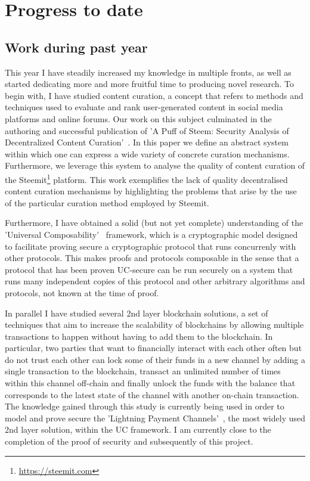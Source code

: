 \section{Progress to date}
  \subsection{Work during past year}
    This year I have steadily increased my knowledge in multiple fronts, as well
    as started dedicating more and more fruitful time to producing novel
    research. To begin with, I have studied content curation, a concept that
    refers to methods and techniques used to evaluate and rank user-generated
    content in social media platforms and online forums. Our work on this
    subject culminated in the authoring and successful publication of 'A Puff of
    Steem: Security Analysis of Decentralized Content
    Curation'~\cite{puffofsteem}. In this paper we define an abstract system
    within which one can express a wide variety of concrete curation mechanisms.
    Furthermore, we leverage this system to analyse the quality of content
    curation of the Steemit\footnote{\url{https://steemit.com}} platform. This
    work exemplifies the lack of quality decentralised content curation
    mechanisms by highlighting the problems that arise by the use of the
    particular curation method employed by Steemit.

    Furthermore, I have obtained a solid (but not yet complete) understanding of
    the 'Universal Composability'~\cite{canetti2001universally} framework, which
    is a cryptographic model designed to facilitate proving secure a
    cryptographic protocol that runs concurrenly with other protocols. This
    makes proofs and protocols composable in the sense that a protocol that has
    been proven UC-secure can be run securely on a system that runs many
    independent copies of this protocol and other arbitrary algorithms and
    protocols, not known at the time of proof.

    In parallel I have studied several 2nd layer blockchain solutions, a set of
    techniques that aim to increase the scalability of blockchains by allowing
    multiple transactions to happen without having to add them to the
    blockchain. In particular, two parties that want to financially interact
    with each other often but do not trust each other can lock some of their
    funds in a new channel by adding a single transaction to the blockchain,
    transact an unlimited number of times within this channel off-chain and
    finally unlock the funds with the balance that corresponds to the latest
    state of the channel with another on-chain transaction. The knowledge gained
    through this study is currently being used in order to model and prove
    secure the 'Lightning Payment Channels'~\cite{lightning}, the most widely
    used 2nd layer solution, within the UC framework. I am currently close to
    the completion of the proof of security and subsequently of this project.

